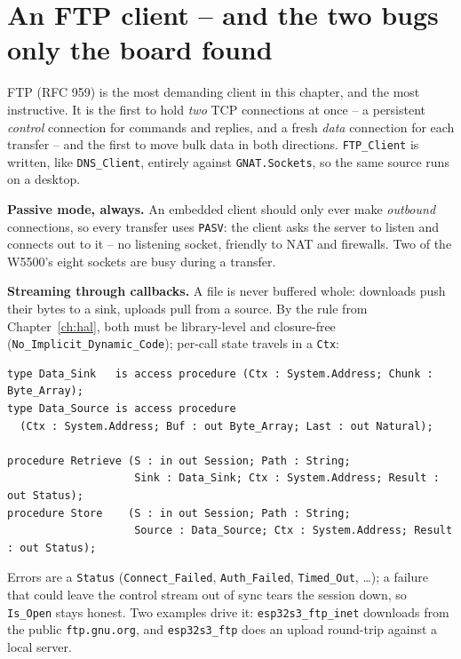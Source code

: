 \section{An FTP client -- and the two bugs only the board found}
\label{ch:net:ftp}

FTP (RFC 959) is the most demanding client in this chapter, and the most
instructive. It is the first to hold \emph{two} TCP connections at once -- a
persistent \emph{control} connection for commands and replies, and a fresh
\emph{data} connection for each transfer -- and the first to move bulk data in
both directions. \texttt{FTP\_Client} is written, like \texttt{DNS\_Client},
entirely against \texttt{GNAT.Sockets}, so the same source runs on a desktop.

\textbf{Passive mode, always.} An embedded client should only ever make
\emph{outbound} connections, so every transfer uses \texttt{PASV}: the client asks
the server to listen and connects out to it -- no listening socket, friendly to
NAT and firewalls. Two of the W5500's eight sockets are busy during a transfer.

\textbf{Streaming through callbacks.} A file is never buffered whole: downloads
push their bytes to a sink, uploads pull from a source. By the rule from
Chapter~\ref{ch:hal}, both must be library-level and closure-free
(\texttt{No\_Implicit\_Dynamic\_Code}); per-call state travels in a \texttt{Ctx}:

\begin{lstlisting}
type Data_Sink   is access procedure (Ctx : System.Address; Chunk : Byte_Array);
type Data_Source is access procedure
  (Ctx : System.Address; Buf : out Byte_Array; Last : out Natural);

procedure Retrieve (S : in out Session; Path : String;
                    Sink : Data_Sink; Ctx : System.Address; Result : out Status);
procedure Store    (S : in out Session; Path : String;
                    Source : Data_Source; Ctx : System.Address; Result : out Status);
\end{lstlisting}

Errors are a \texttt{Status} (\texttt{Connect\_Failed}, \texttt{Auth\_Failed},
\texttt{Timed\_Out}, \dots); a failure that could leave the control stream out of
sync tears the session down, so \texttt{Is\_Open} stays honest. Two examples drive
it: \texttt{esp32s3\_ftp\_inet} downloads from the public \texttt{ftp.gnu.org}, and
\texttt{esp32s3\_ftp} does an upload round-trip against a local server.

